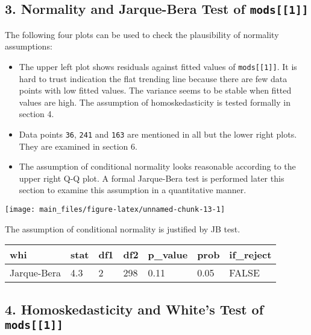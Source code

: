 \documentclass[main.tex]{subfiles}
\begin{document}
\hypertarget{normality-and-jarque-bera-test-of-mods1}{%
\subsection{\texorpdfstring{3. Normality and Jarque-Bera Test of
\texttt{mods{[}{[}1{]}{]}}}{3. Normality and Jarque-Bera Test of mods{[}{[}1{]}{]}}}\label{normality-and-jarque-bera-test-of-mods1}}

The following four plots can be used to check the plausibility of
normality assumptions:

\begin{itemize}
\tightlist
\item
  The upper left plot shows residuals against fitted values of
  \texttt{mods{[}{[}1{]}{]}}. It is hard to trust indication the flat
  trending line because there are few data points with low fitted
  values. The variance seems to be stable when fitted values are high.
  The assumption of homoskedasticity is tested formally in section 4.
\item
  Data points \texttt{36}, \texttt{241} and \texttt{163} are mentioned
  in all but the lower right plots. They are examined in section 6.
\item
  The assumption of conditional normality looks reasonable according to
  the upper right Q-Q plot. A formal Jarque-Bera test is performed later
  this section to examine this assumption in a quantitative manner.
\end{itemize}

\begin{center}\texttt{[image: main\_files/figure-latex/unnamed-chunk-13-1]} \end{center}

The assumption of conditional normality is justified by JB test.

\begin{table}[H]
\centering
\begin{tabular}{lllllll}
\toprule
whi & stat & df1 & df2 & p\_value & prob & if\_reject\\
\midrule
Jarque-Bera & 4.3 & 2 & 298 & 0.11 & 0.05 & FALSE\\
\bottomrule
\end{tabular}
\end{table}

\hypertarget{homoskedasticity-and-whites-test-of-mods1}{%
\subsection{\texorpdfstring{4. Homoskedasticity and White's Test of
\texttt{mods{[}{[}1{]}{]}}}{4. Homoskedasticity and White's Test of mods{[}{[}1{]}{]}}}\label{homoskedasticity-and-whites-test-of-mods1}}
\end{document}
